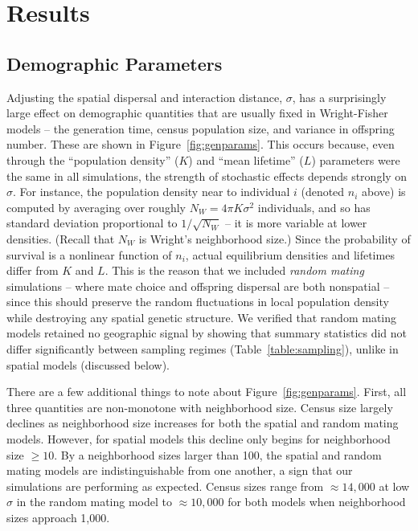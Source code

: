 \documentclass[11pt,twoside,lineno]{preprint}
\begin{document}
\section{Results}



\subsection{Demographic Parameters}

Adjusting the spatial dispersal and interaction distance, $\sigma$,
has a surprisingly large effect on demographic quantities that are usually fixed in Wright-Fisher models --
the generation time, census population size, and variance in offspring number.
These are shown in Figure~\ref{fig:genparams}.
This occurs because,
even through the ``population density'' ($K$) and ``mean lifetime'' ($L$) parameters
were the same in all simulations,
the strength of stochastic effects depends strongly on $\sigma$.
For instance, 
the population density near to individual $i$ (denoted $n_i$ above)
is computed by averaging over roughly $N_W = 4 \pi K \sigma^2$ individuals,
and so has standard deviation proportional to $1/\sqrt{N_W}$ --
it is more variable at lower densities.
(Recall that $N_W$ is Wright's neighborhood size.)
Since the probability of survival is a nonlinear function of $n_i$,
actual equilibrium densities and lifetimes differ from $K$ and $L$.
This is the reason that we included \emph{random mating} simulations --
where mate choice and offspring dispersal are both nonspatial --
since this should preserve the random fluctuations in local population density
while destroying any spatial genetic structure.
We verified that random mating models retained no geographic signal
by showing that summary statistics did not differ significantly between sampling regimes
(Table~\ref{table:sampling}), unlike in spatial models (discussed below).

There are a few additional things to note about Figure~\ref{fig:genparams}. 
First, all three quantities are non-monotone with neighborhood size. 
Census size largely declines as neighborhood size increases for both the spatial and random mating models. 
However, for spatial models this decline only begins for neighborhood size $\geq 10$. 
By a neighborhood sizes larger than 100, the spatial and random mating models are indistinguishable from one another, 
a sign that our simulations are performing as expected. 
Census sizes range from $\approx 14,000$ at low $\sigma$ in the random mating model to $\approx 10,000$ for both models when neighborhood sizes approach 1,000.
\end{document}
